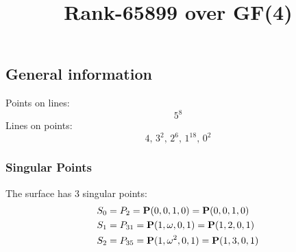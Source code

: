 \documentclass{article}
\newcommand\setTBstruts{\def\T{\rule{0pt}{2.6ex}}%
\def\B{\rule[-1.2ex]{0pt}{0pt}}}
\newcommand{\bP}{{\bf P}}
\begin{document}
 
\setTBstruts



{\allowdisplaybreaks%






\title{Rank-65899 over GF(4)}
\author{}%
\maketitle%
%
{}



\subsection*{General information}
Points on lines:
$$
5^8$$
Lines on points:
$$
4,\,3^2,\,2^6,\,1^{18},\,0^2$$
\subsubsection*{Singular Points}
The surface has 3 singular points:\\
\begin{align*}
S_{0} &= P_{2}=\bP(0, 0, 1, 0) = \bP(0, 0, 1, 0)\\
S_{1} &= P_{31}=\bP(1, \omega , 0, 1) = \bP(1, 2, 0, 1)\\
S_{2} &= P_{35}=\bP(1, \omega^{2}, 0, 1) = \bP(1, 3, 0, 1)\\
\end{align*}
}
\end{document}
